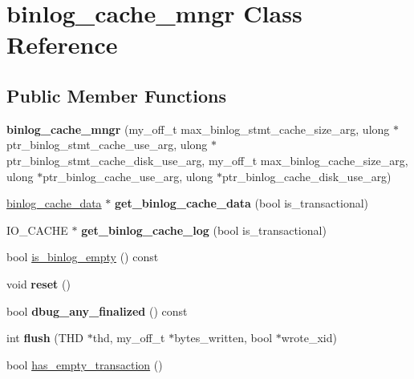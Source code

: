 \hypertarget{classbinlog__cache__mngr}{}\section{binlog\+\_\+cache\+\_\+mngr Class Reference}
\label{classbinlog__cache__mngr}
\subsection*{Public Member Functions}
\begin{DoxyCompactItemize}
\item 
\mbox{\label{classbinlog__cache__mngr_a73a43667fbcf39a55890df9cda66879d}} 
{\bfseries binlog\+\_\+cache\+\_\+mngr} (my\+\_\+off\+\_\+t max\+\_\+binlog\+\_\+stmt\+\_\+cache\+\_\+size\+\_\+arg, ulong $\ast$ptr\+\_\+binlog\+\_\+stmt\+\_\+cache\+\_\+use\+\_\+arg, ulong $\ast$ptr\+\_\+binlog\+\_\+stmt\+\_\+cache\+\_\+disk\+\_\+use\+\_\+arg, my\+\_\+off\+\_\+t max\+\_\+binlog\+\_\+cache\+\_\+size\+\_\+arg, ulong $\ast$ptr\+\_\+binlog\+\_\+cache\+\_\+use\+\_\+arg, ulong $\ast$ptr\+\_\+binlog\+\_\+cache\+\_\+disk\+\_\+use\+\_\+arg)
\item 
\mbox{\label{classbinlog__cache__mngr_a4a79f5f066065c2c31fa428303288539}} 
\mbox{\hyperlink{classbinlog__cache__data}{binlog\+\_\+cache\+\_\+data}} $\ast$ {\bfseries get\+\_\+binlog\+\_\+cache\+\_\+data} (bool is\+\_\+transactional)
\item 
\mbox{\label{classbinlog__cache__mngr_a7e823f34bc2efd9880d6e9a5b32bb941}} 
I\+O\+\_\+\+C\+A\+C\+HE $\ast$ {\bfseries get\+\_\+binlog\+\_\+cache\+\_\+log} (bool is\+\_\+transactional)
\item 
bool \mbox{\hyperlink{classbinlog__cache__mngr_a9587d264a7571d8c7d985cb563f55fc1}{is\+\_\+binlog\+\_\+empty}} () const
\item 
\mbox{\label{classbinlog__cache__mngr_a428c03604611f2faaa4e9229f18995c7}} 
void {\bfseries reset} ()
\item 
\mbox{\label{classbinlog__cache__mngr_aea4ced216774b402d1ebccd770b26786}} 
bool {\bfseries dbug\+\_\+any\+\_\+finalized} () const
\item 
\mbox{\label{classbinlog__cache__mngr_ae3c90e75980d1ae6027fccbe45a49667}} 
int {\bfseries flush} (T\+HD $\ast$thd, my\+\_\+off\+\_\+t $\ast$bytes\+\_\+written, bool $\ast$wrote\+\_\+xid)
\item 
bool \mbox{\hyperlink{classbinlog__cache__mngr_a2467716f5b8e405765df05d8240bf287}{has\+\_\+empty\+\_\+transaction}} ()
\end{DoxyCompactItemize}
